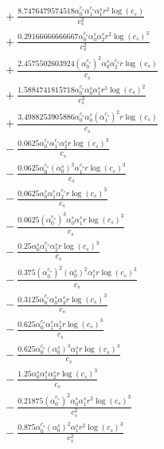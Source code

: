 \documentclass[10pt]{article}
\begin{document}
\begin{align*}
&{}  + \frac{8.7476479574518 \alpha_{0}^{c_s} \alpha_{1}^{c_s} \alpha_{1}^s r^{2} \log{\left(c_{s} \right)}}{c_{s}^{2}} \\
&{}  + \frac{0.29166666666667 \alpha_{0}^{c_s} \alpha_{0}^s \alpha_{2}^s r^{2} \log{\left(c_{s} \right)}^{3}}{c_{s}^{2}} \\
&{}  + \frac{2.4575502603924 \left(\alpha_{0}^{c_s}\right)^{2} \alpha_{0}^s \alpha_{2}^{c_s} r \log{\left(c_{s} \right)}}{c_{s}} \\
&{}  + \frac{1.5884741815718 \alpha_{0}^{c_s} \alpha_{0}^s \alpha_{1}^s r^{3} \log{\left(c_{s} \right)}^{2}}{c_{s}^{3}} \\
&{}  + \frac{3.4988253905886 \alpha_{0}^{c_s} \alpha_{0}^s \left(\alpha_{1}^{c_s}\right)^{2} r \log{\left(c_{s} \right)}}{c_{s}} \\
&{}  - \frac{0.0625 \alpha_{0}^{c_s} \alpha_{1}^{c_s} \alpha_{2}^s r \log{\left(c_{s} \right)}^{3}}{c_{s}} \\
&{}  - \frac{0.0625 \alpha_{0}^{c_s} \left(\alpha_{0}^s\right)^{3} \alpha_{1}^{c_s} r \log{\left(c_{s} \right)}^{3}}{c_{s}} \\
&{}  - \frac{0.0625 \alpha_{0}^s \alpha_{1}^s \alpha_{2}^{c_s} r \log{\left(c_{s} \right)}^{3}}{c_{s}} \\
&{}  - \frac{0.0625 \left(\alpha_{0}^{c_s}\right)^{3} \alpha_{0}^s \alpha_{1}^s r \log{\left(c_{s} \right)}^{3}}{c_{s}} \\
&{}  - \frac{0.25 \alpha_{0}^s \alpha_{1}^{c_s} \alpha_{2}^s r \log{\left(c_{s} \right)}^{3}}{c_{s}} \\
&{}  - \frac{0.375 \left(\alpha_{0}^{c_s}\right)^{2} \left(\alpha_{0}^s\right)^{2} \alpha_{1}^s r \log{\left(c_{s} \right)}^{3}}{c_{s}} \\
&{}  - \frac{0.3125 \alpha_{0}^{c_s} \alpha_{0}^s \alpha_{3}^s r \log{\left(c_{s} \right)}^{3}}{c_{s}} \\
&{}  - \frac{0.625 \alpha_{0}^{c_s} \alpha_{1}^s \alpha_{2}^s r \log{\left(c_{s} \right)}^{3}}{c_{s}} \\
&{}  - \frac{0.625 \alpha_{0}^{c_s} \left(\alpha_{0}^s\right)^{3} \alpha_{1}^s r \log{\left(c_{s} \right)}^{3}}{c_{s}} \\
&{}  - \frac{1.25 \alpha_{0}^s \alpha_{1}^s \alpha_{2}^s r \log{\left(c_{s} \right)}^{3}}{c_{s}} \\
&{}  - \frac{0.21875 \left(\alpha_{0}^{c_s}\right)^{2} \alpha_{0}^s \alpha_{1}^s r^{2} \log{\left(c_{s} \right)}^{3}}{c_{s}^{2}} \\
&{}  - \frac{0.875 \alpha_{0}^{c_s} \left(\alpha_{0}^s\right)^{2} \alpha_{1}^s r^{2} \log{\left(c_{s} \right)}^{3}}{c_{s}^{2}} \\

\end{align*}
\end{document}
